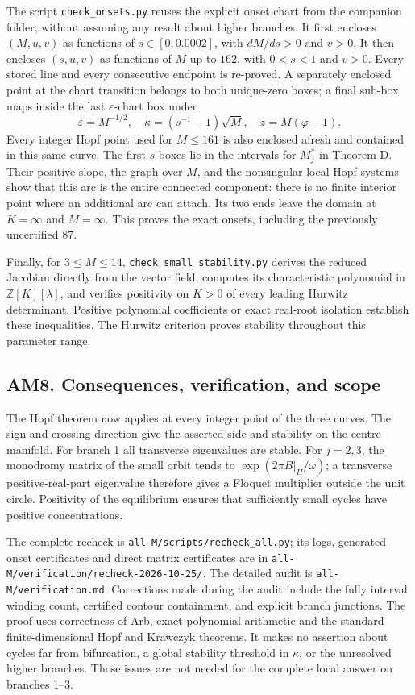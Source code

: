 The script \texttt{check\_onsets.py} reuses the explicit onset chart from the companion
folder, without assuming any result about higher branches. It first encloses
$(M,u,v)$ as functions of $s\in[0,0.0002]$, with $dM/ds>0$ and $v>0$.
It then encloses $(s,u,v)$ as functions of $M$ up to $162$, with $0<s<1$ and $v>0$.
Every stored line and every consecutive endpoint is re-proved. A separately enclosed
point at the chart transition belongs to both unique-zero boxes; a final sub-box maps
inside the last $\varepsilon$-chart box under
\[
 \varepsilon=M^{-1/2},\quad\kappa=(s^{-1}-1)\sqrt M,\quad z=M(\varphi-1).
\]
Every integer Hopf point used for $M\le161$ is also enclosed afresh and contained in
this same curve. The first $s$-boxes lie in the intervals for $M_j^*$ in Theorem D.
Their positive slope, the graph over $M$, and the nonsingular local Hopf systems show
that this arc is the entire connected component: there is no finite interior point
where an additional arc can attach. Its two ends leave the domain at $K=\infty$ and
$M=\infty$. This proves the exact onsets, including the previously uncertified $87$.

Finally, for $3\le M\le14$, \texttt{check\_small\_stability.py} derives the reduced
Jacobian directly from the vector field, computes its characteristic polynomial in
$\mathbb Z[K][\lambda]$, and verifies positivity on $K>0$ of every leading Hurwitz
determinant. Positive polynomial coefficients or exact real-root isolation establish
these inequalities. The Hurwitz criterion proves stability throughout this parameter range.

\subsection{AM8. Consequences, verification, and scope}
The Hopf theorem now applies at every integer point of the three curves. The sign
and crossing direction give the asserted side and stability on the centre manifold.
For branch 1 all transverse eigenvalues are stable. For $j=2,3$, the monodromy matrix
of the small orbit tends to $\exp(2\pi B|_H/\omega)$; a transverse positive-real-part
eigenvalue therefore gives a Floquet multiplier outside the unit circle. Positivity of
the equilibrium ensures that sufficiently small cycles have positive concentrations.

The complete recheck is \texttt{all-M/scripts/recheck\_all.py}; its logs, generated onset
certificates and direct matrix certificates are in
\texttt{all-M/verification/recheck-2026-10-25/}. The detailed audit is
\texttt{all-M/verification.md}. Corrections made during the audit include the fully
interval winding count, certified contour containment, and explicit branch junctions.
The proof uses correctness of Arb, exact polynomial arithmetic and the standard
finite-dimensional Hopf and Krawczyk theorems. It makes no assertion about cycles far
from bifurcation, a global stability threshold in $\kappa$, or the unresolved higher
branches. Those issues are not needed for the complete local answer on branches 1--3.
